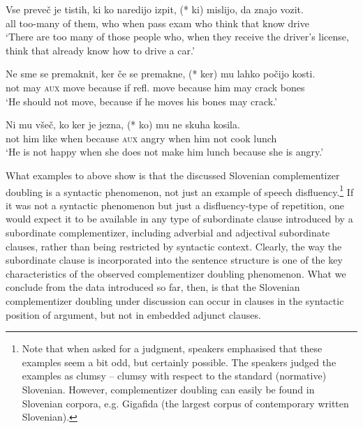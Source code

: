 \documentclass[output=paper,
]{langscibook}
\begin{document}
\begin{exe} 
\ex \label{ex:plesnicar:eleven}
\gll  Vse	preveč	je	tistih,	ki 	ko	naredijo	izpit,	(*\hspace{-2pt} ki) mislijo,	da	znajo	vozit.\\
	all	too-many of them,	who	when	pass		exam	{} who think		that	know	drive\\
\trans `There are too many of those people who, when they receive the driver's license, think that already know how to drive a car.' %
\end{exe}
\begin{exe} 

\ex \label{ex:plesnicar:twelve}
\gll Ne	sme	se	premaknit,	ker		če	se	premakne, (*\hspace{-2pt} ker)		mu	lahko	počijo	kosti.\\
	not	may	\textsc{aux}	move	because	if	refl.	move {} because	him	may	crack	bones\\
\trans `He should not move, because if he moves his bones may crack.' 
\end{exe}


\begin{exe} 
\ex \label{ex:plesnicar:thirteen}
\gll Ni	mu	všeč,	ko	ker		je	jezna,	(*\hspace{-2pt} ko)	mu	ne	skuha kosila. \\
	not	him	like	when	because	\textsc{aux}	angry	{} when	him	not	cook lunch \\
\trans `He is not happy when she does not make him lunch because she is angry.' 
\end{exe}

\noindent What examples  to  above show is that the discussed Slovenian complementizer doubling is a syntactic phenomenon, not just an example of speech disfluency.\footnote{Note that when asked for a judgment, speakers emphasised that these examples seem a bit odd, but certainly possible. The speakers judged the examples as clumsy – clumsy with respect to the standard (normative) Slovenian. However, complementizer doubling can easily be found in Slovenian corpora, e.g. Gigafida (the largest corpus of contemporary written Slovenian).} If it was not a syntactic phenomenon but just a disfluency-type of repetition, one would expect it to be available in any type of subordinate clause introduced by a subordinate complementizer, including adverbial and adjectival subordinate clauses, rather than being restricted by syntactic context. Clearly, the way the subordinate clause is incorporated into the sentence structure is one of the key characteristics of the observed complementizer doubling phenomenon. What we conclude from the data introduced so far, then, is that the Slovenian complementizer doubling under discussion can occur in clauses in the syntactic position of argument, but not in embedded adjunct clauses.
\end{document}
